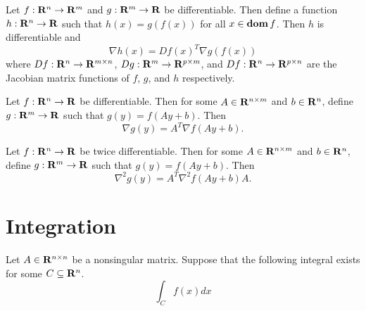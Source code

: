 \begin{corollary}
\label{corollary:chain-rule-grad}
Let $f:\mathbf{R}^n\to\mathbf{R}^m$ and $g:\mathbf{R}^m\to\mathbf{R}$ be differentiable.
Then define a function $h:\mathbf{R}^n\to\mathbf{R}$ such that $h(x) = g(f(x))$ for all $x\in\mathop{\bf dom} f$.
Then $h$ is differentiable and
\begin{equation}
\label{eq:chain-rule-gen}
\nabla h(x) = Df(x)^T \nabla g(f(x))
\end{equation}
where
$D f:\mathbf{R}^n\to\mathbf{R}^{m\times n}$,
$D g:\mathbf{R}^m\to\mathbf{R}^{p\times m}$,
and $D f:\mathbf{R}^n\to\mathbf{R}^{p\times n}$
are the Jacobian matrix functions of $f$, $g$, and $h$ respectively.
\end{corollary}

\begin{corollary}
\label{corollary:dixu}
Let $f:\mathbf{R}^n\to\mathbf{R}$ be differentiable.
Then for some $A\in\mathbf{R}^{n\times m}$ and $b\in\mathbf{R}^n$,
define $g:\mathbf{R}^m\to\mathbf{R}$ such that $g(y) = f(Ay+b)$.
Then
\begin{equation}
\label{eq:dixu}
\nabla g(y) = A^T \nabla f(Ay+b).
\end{equation}
\end{corollary}


\begin{corollary}
\label{corollary:eicg}
Let $f:\mathbf{R}^n\to\mathbf{R}$ be twice differentiable.
Then for some $A\in\mathbf{R}^{n\times m}$ and $b\in\mathbf{R}^n$,
define $g:\mathbf{R}^m\to\mathbf{R}$ such that $g(y) = f(Ay+b)$.
Then
\begin{equation}
\label{eq:eicg}
\nabla^2 g(y) = A^T \nabla^2 f(Ay+b)A.
\end{equation}
\end{corollary}

\section{Integration}


\begin{lemma}
Let $A\in\mathbf{R}^{n\times n}$ be a nonsingular matrix. Suppose that the following integral exists for some $C\subseteq \mathbf{R}^n$.
\begin{equation}
\int_{C} f(x) dx
\end{equation}
\end{lemma}





